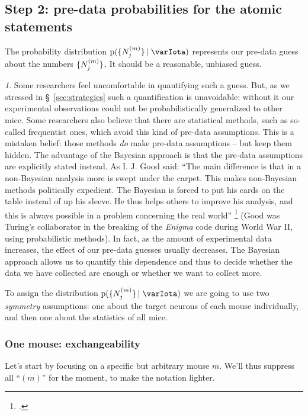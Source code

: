 \documentclass[\ifafour a4paper,12pt,\else a5paper,10pt,\fi%
onecolumn,oneside,article,%
british%
]{memoir}
\theoremstyle{remark}
\theoremstyle{innote}
\newtheorem*{innote}{}
\newcommand*{\citep}{\footcites}
\newcommand*{\pf}{\mathrm{p}}%
\renewcommand*{\|}[1][]{\nonscript\,#1\vert\nonscript\;\mathopen{}}
\newcommand*{\sect}{\S}%
\newcommand*{\yI}{\varIota}
\newcommand*{\yNm}[1][m]{N^{(#1)}}
\DeclarePairedDelimiter\tu{\{}{\}}
\begin{document}
\subsection{Step 2: pre-data probabilities for the atomic statements}
\label{sec:step_joint_prob}

The probability distribution $\pf(\tu{\yNm_{j}} \| \yI)$ represents our
pre-data guess about the numbers $\tu{\yNm_{j}}$. It should be a
reasonable, unbiased guess.
\begin{innote}
  Some researchers feel uncomfortable in quantifying such a guess. But, as
  we stressed in \sect~\ref{sec:strategies} such a quantification is
  unavoidable: without it our experimental observations could not be
  probabilistically generalized to other mice. Some researchers also
  believe that there are statistical methods, such as so-called frequentist
  ones, which avoid this kind of pre-data assumptions. This is a mistaken
  belief: those methods \emph{do} make pre-data assumptions -- but keep
  them hidden. The advantage of the Bayesian approach is that the pre-data
  assumptions are explicitly stated instead. As I. J. Good said:
  \enquote{The main difference is that in a non-Bayesian analysis more is
    swept under the carpet. This makes non-Bayesian methods politically
    expedient. The Bayesian is forced to put his cards on the table instead
    of up his sleeve. He thus helps others to improve his analysis, and
    this is always possible in a problem concerning the real world}
  \citep[\sect~2.3 p.~26]{good1969} (Good was Turing's collaborator in the
  breaking of the \emph{Enigma} code during World War II, using
  probabilistic methods). In fact, as the amount of experimental data
  increases, the effect of our pre-data guesses usually decreases. The
  Bayesian approach allows us to quantify this dependence and thus to
  decide whether the data we have collected are enough or whether we want
  to collect more.
\end{innote}


To assign the distribution $\pf(\tu{\yNm_{j}} \| \yI)$ we are going to use
two \emph{symmetry} assumptions: one about the target neurons of each mouse
individually, and then one about the statistics of all mice.

\subsubsection{One mouse: exchangeability}
\label{sec:onemouse_exch}

Let's start by focusing on a specific but arbitrary mouse $m$. We'll thus
suppress all \enquote{$(m)$} for the moment, to make the notation lighter.
\end{document}
